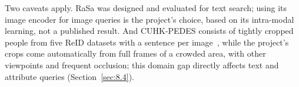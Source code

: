 Two caveats apply. RaSa was designed and evaluated for text search; using its image encoder for image queries is the project's choice, based on its intra-modal learning, not a published result. And CUHK-PEDES consists of tightly cropped people from five ReID datasets with a sentence per image~\cite{li2017cuhkpedes}, while the project's crops come automatically from full frames of a crowded area, with other viewpoints and frequent occlusion; this domain gap directly affects text and attribute queries (Section~\ref{sec:8.4}).
